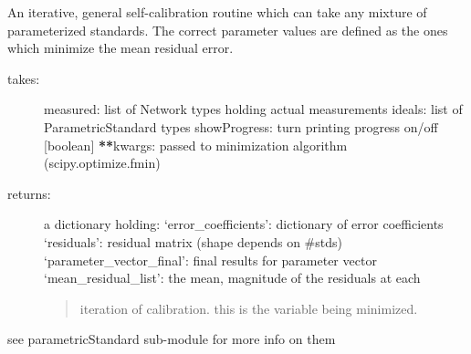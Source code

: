 \documentclass[letterpaper,10pt,english]{sphinxmanual}
\begin{document}
\begin{fulllineitems}
\label{api/mwavepy.calibration:mwavepy.calibration.calibrationAlgorithms.parameterized_self_calibration}
An iterative, general self-calibration routine which can take any
mixture of parameterized standards. The correct parameter values
are defined as the ones which minimize the mean residual error.
\begin{description}
\item[{takes:}] \leavevmode
measured: list of Network types holding actual measurements
ideals: list of ParametricStandard types
showProgress: turn printing progress on/off {[}boolean{]}
{\color{red}\bfseries{}**}kwargs: passed to minimization algorithm (scipy.optimize.fmin)

\item[{returns:}] \leavevmode
a dictionary holding:
`error\_coefficients': dictionary of error coefficients
`residuals': residual matrix (shape depends on \#stds)
`parameter\_vector\_final': final results for parameter vector
`mean\_residual\_list': the mean, magnitude of the residuals at each
\begin{quote}

iteration of calibration. this is the variable being minimized.
\end{quote}

\end{description}

see  parametricStandard sub-module for more info on them

\end{fulllineitems}

\end{document}
